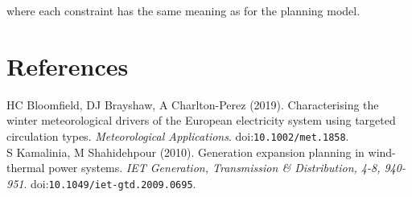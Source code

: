 \documentclass[preprint]{elsarticle}
\begin{document}
\noindent where each constraint has the same meaning as for the planning model.



\section{References}
\label{sec:references}

\noindent HC Bloomfield, DJ Brayshaw, A Charlton-Perez (2019). Characterising the winter meteorological drivers of the European electricity system using targeted circulation types. \textit{Meteorological Applications}. doi:\texttt{10.1002/met.1858}. \\

\noindent S Kamalinia, M Shahidehpour (2010). Generation expansion planning in wind-thermal power systems. \textit{IET Generation, Transmission \& Distribution, 4-8, 940-951}. doi:\texttt{10.1049/iet-gtd.2009.0695}.
\end{document}
